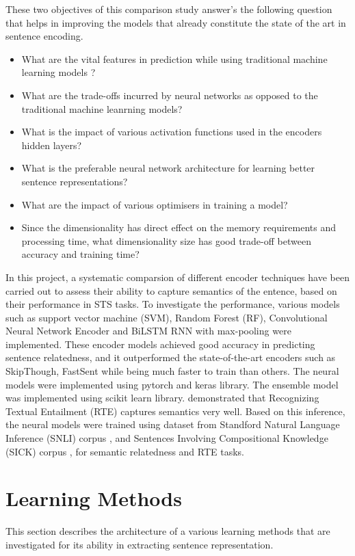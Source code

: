 \documentclass[12pt]{report} %
\begin{document}
These two objectives of this comparison study answer's the following question that helps in improving the models that already constitute the state of the art in sentence encoding.

\begin{itemize}
	\item What are the vital features in prediction while using traditional machine learning models ?
	\item What are the trade-offs incurred by neural networks as opposed to the traditional machine leanrning models?
	\item What is the impact of various activation functions used in the encoders hidden layers?
	\item What is the preferable neural network architecture for learning better sentence representations? 
	\item What are the impact of various optimisers in training a model?
	\item Since the dimensionality has direct effect on the memory requirements and processing time, what dimensionality size has good trade-off between accuracy and training time? 
\end{itemize}

In this project, a systematic comparsion of different encoder techniques have been carried out to assess their ability to capture semantics of the entence, based on their performance in STS tasks. To investigate the performance, various models such as support vector machine (SVM), Random Forest (RF), Convolutional Neural Network Encoder \citep{shao2017hcti} and BiLSTM RNN with max-pooling \citep{conneau2017supervised} were implemented. These encoder models achieved good accuracy in predicting sentence relatedness, and it outperformed the state-of-the-art encoders such as SkipThough, FastSent while being much faster to train than others. The neural models were implemented using pytorch and keras library. The ensemble model was implemented using scikit learn library. \cite{conneau2017supervised} demonstrated that Recognizing Textual Entailment (RTE) captures semantics very well. Based on this inference, the neural models were trained using dataset from Standford Natural Language Inference (SNLI) corpus  \citep{bowman2015large}, and Sentences Involving Compositional
Knowledge (SICK) corpus \citep{marelli2014semeval}, for semantic relatedness and RTE tasks.
 

\section*{Learning Methods}
This section describes the architecture of a various learning methods that are investigated for its ability in extracting sentence representation. 
\end{document}
